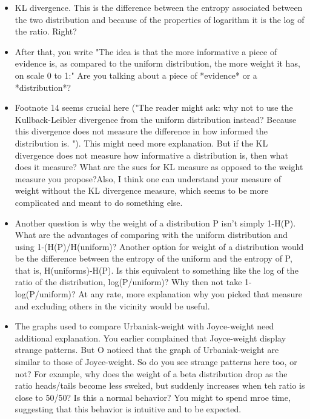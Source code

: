 \documentclass[
  10pt,
  dvipsnames,enabledeprecatedfontcommands]{scrartcl}
\begin{document}
\begin{itemize}
\item KL divergence. This is the difference between the entropy associated between the two distribution and because of the properties of logarithm it is the log of the ratio. Right?

\item After that, you write "The idea is that the more informative a piece of evidence is, as compared to the uniform distribution, the more weight it has, on scale 0 to 1:" Are you talking about a piece of *evidence* or a *distribution*? 

\item Footnote 14 seems crucial here ("The reader might ask: why not to use the Kullback-Leibler divergence from the uniform distribution instead? Because this divergence does not measure the difference in how informed the distribution is. "). This might need more explanation. But if the KL divergence does not measure how informative a distribution is, then what does it measure? What are the sues for KL measure as opposed to the weight measure you propose?Also, I think one can understand your measure of weight without the KL divergence measure, which seems to be more complicated and meant to do something else. 

\item Another question is why the weight of a distribution P isn't simply 1-H(P). What are the advantages of comparing with the uniform distribution and using 1-(H(P)/H(uniform)? Another option for weight of a distribution would be the difference between the entropy of the uniform and the entropy of P, that is, H(uniforms)-H(P). Is this equivalent to something like the log of the ratio of the distribution, log(P/uniform)? Why then not take 1-log(P/uniform)? At any rate, more explanation why you picked that measure and excluding others in the vicinity would be useful.

\item The graphs used to compare Urbaniak-weight with Joyce-weight need additional explanation. You earlier complained that Joyce-weight display strange patterns. But O noticed that the graph of Urbaniak-weight are similar to those of Joyce-weight. So do you see strange patterns here too, or not? For example, why does the weight of a beta distribution drop as the ratio heads/tails become less sweked, but suddenly increases when teh ratio is close to 50/50? Is this a normal behavior? You might to spend mroe time, suggesting that this behavior is intuitive and to be expected. 


\end{itemize}
\end{document}
